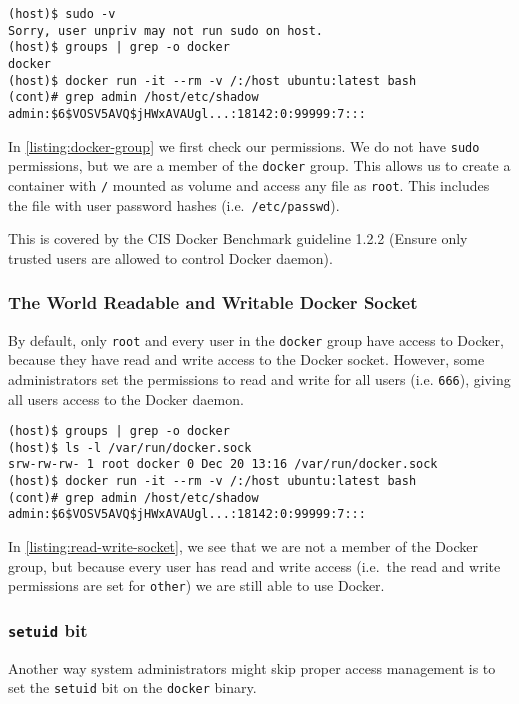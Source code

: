 \begin{lstlisting}[caption={Docker \lstinline{group} exploit example.},captionpos=b,label={listing:docker-group}]
(host)$ sudo -v
Sorry, user unpriv may not run sudo on host.
(host)$ groups | grep -o docker
docker
(host)$ docker run -it --rm -v /:/host ubuntu:latest bash
(cont)# grep admin /host/etc/shadow
admin:$6$VOSV5AVQ$jHWxAVAUgl...:18142:0:99999:7:::
\end{lstlisting}

In \autoref{listing:docker-group} we first check our permissions. We do not have \lstinline{sudo} permissions, but we are a member of the \lstinline{docker} group. This allows us to create a container with \lstinline{/} mounted as volume and access any file as \lstinline{root}. This includes the file with user password hashes (i.e.\ \lstinline{/etc/passwd}).

\medskip

This is covered by the CIS Docker Benchmark guideline 1.2.2 (Ensure only trusted users are allowed to control Docker daemon).

\subsubsection{The World Readable and Writable Docker Socket}
By default, only \lstinline{root} and every user in the \lstinline{docker} group have access to Docker, because they have read and write access to the Docker socket. However, some administrators set the permissions to read and write for all users (i.e. \lstinline{666}), giving all users access to the Docker daemon.

\begin{lstlisting}[caption={All users can use Docker if they have read and write access to the Socket},captionpos=b,label={listing:read-write-socket}]
(host)$ groups | grep -o docker
(host)$ ls -l /var/run/docker.sock
srw-rw-rw- 1 root docker 0 Dec 20 13:16 /var/run/docker.sock
(host)$ docker run -it --rm -v /:/host ubuntu:latest bash
(cont)# grep admin /host/etc/shadow
admin:$6$VOSV5AVQ$jHWxAVAUgl...:18142:0:99999:7:::
\end{lstlisting}

In \autoref{listing:read-write-socket}, we see that we are not a member of the Docker group, but because every user has read and write access (i.e.\ the read and write permissions are set for \lstinline{other}) we are still able to use Docker.

\subsubsection{\texorpdfstring{\lstinline{setuid}}{setuid} bit}\label{subsubsection:setuid}
Another way system administrators might skip proper access management is to set the \lstinline{setuid} bit on the \lstinline{docker} binary.


